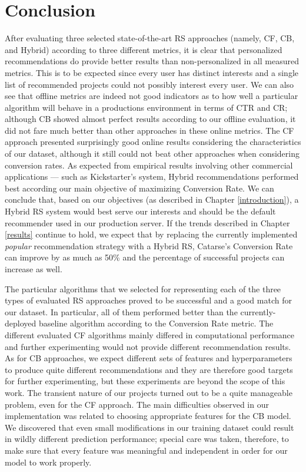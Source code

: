 \documentclass[cic,tc,english]{iiufrgs}
\newcommand{\adriano}[1]{#1}
\begin{document}
\chapter{Conclusion}
After evaluating three selected state-of-the-art RS approaches (namely, CF, CB, and Hybrid) \adriano{according to three different metrics}, it is clear that personalized recommendations do provide better results than non-personalized in all measured metrics. This is to be expected since every user has distinct interests and a single list of recommended projects could not possibly interest every user. We can also see that offline metrics are indeed not good indicators as to how well a particular algorithm will behave in a productions environment \adriano{in terms of CTR and CR}; although CB showed almost perfect results according to our offline evaluation, it did not fare much better than other approaches in \adriano{these online metrics}. The CF approach presented surprisingly good online results considering the characteristics of our dataset, although it still could not beat other approaches when considering conversion rates. As expected from \adriano{empirical results involving other commercial applications ---  such as Kickstarter's system}, Hybrid recommendations performed best according our main objective of maximizing Conversion Rate. We can conclude that, based on our objectives (as described in Chapter \ref{introduction}), a Hybrid RS system would best serve our interests and should be the default recommender used in our production server. \adriano{If the trends described in Chapter \ref{results} continue to hold, we expect that by replacing the currently implemented \textit{popular} recommendation strategy with a Hybrid RS, Catarse's Conversion Rate can improve by as much as 50\% and the percentage of successful projects can increase as well.}

\adriano{The particular algorithms that we selected for representing each of the three types of evaluated RS approaches} proved to be successful and a good match for our dataset. \adriano{In particular, all of them performed better than the currently-deployed baseline algorithm according to the Conversion Rate metric}. \adriano{The different evaluated} CF algorithms mainly differed in \adriano{computational} performance and further experimenting would not provide different \adriano{recommendation} results. As for CB approaches, we expect different \adriano{sets of features and hyperparameters} to produce quite different recommendations and they are therefore good targets for further experimenting, but these experiments are beyond the scope of this work. The transient nature of our projects turned out to be a quite manageable problem, even for the CF approach. The main difficulties observed in our implementation was related to choosing appropriate features for the CB model. We discovered that even small modifications in our training dataset could result in wildly different prediction performance; special care was taken, therefore, to make sure that every feature was meaningful and independent in order for our model to work properly.
\end{document}
